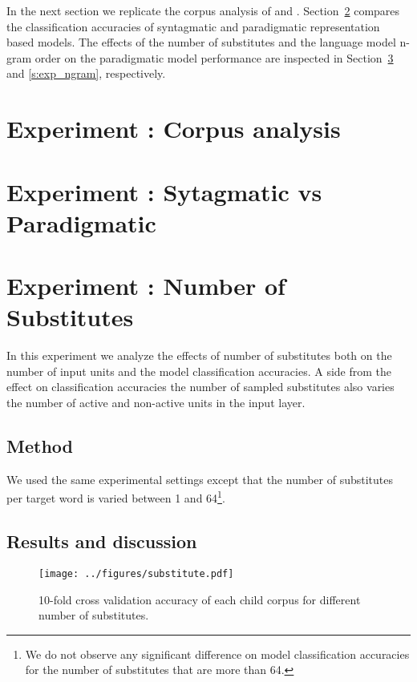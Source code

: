 In the next section we replicate the corpus analysis of \cite{Mintz200391} and
\cite{clair2010}.  Section~\ref{s:exp_paradigmatic} compares the classification
accuracies of syntagmatic and paradigmatic representation based models.  The
effects of the number of substitutes and the language model n-gram order on the
paradigmatic model performance are inspected in Section~\ref{s:exp_substitutes}
and \ref{s:exp_ngram}, respectively. 

\section{Experiment : Corpus analysis}
\label{s:exp_corpus}
\section{Experiment : Sytagmatic vs Paradigmatic}
\label{s:exp_paradigmatic}


\section{Experiment : Number of Substitutes}
\label{s:exp_substitutes}
In this experiment we analyze the effects of number of substitutes both on the
number of input units and the model classification accuracies.  A side from the
effect on classification accuracies the number of sampled substitutes also
varies the number of active and non-active units in the input layer.  

\subsection{Method} 
We used the same experimental settings except that the number of substitutes
per target word is varied between 1 and 64\footnote{We do not observe any
significant difference on model classification accuracies for the number of
substitutes that are more than 64.}.

\subsection{Results and discussion}
\begin{figure}[ht]
  \centering
  \texttt{[image: ../figures/substitute.pdf]}
  \caption{10-fold cross validation accuracy of each child corpus for different
  number of substitutes.}
  \label{fig:substitutes}
\end{figure} 

